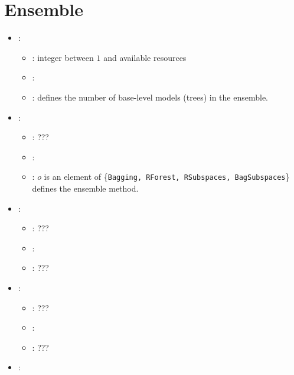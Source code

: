 \section{Ensemble}


\begin{itemize}
    \item {}:
           \begin{itemize}
                \item \optionPossibleValues{}: integer between $1$ and available resources
                \item \optionDefaultValue{}: 
                \item \optionDescrption{}:  defines the number of base-level models (trees) in the ensemble.
           \end{itemize}
    \item {}:
           \begin{itemize}
                \item \optionPossibleValues{}: ???
                \item \optionDefaultValue{}: 
                \item \optionDescrption{}: $o$ is an element of \{\texttt{Bagging, RForest, RSubspaces, BagSubspaces}\} defines the ensemble method.
           \end{itemize}
    \item {}:
           \begin{itemize}
                \item \optionPossibleValues{}: ???
                \item \optionDefaultValue{}: 
                \item \optionDescrption{}: ???
           \end{itemize}
    \item {}:
           \begin{itemize}
                \item \optionPossibleValues{}: ???
                \item \optionDefaultValue{}: 
                \item \optionDescrption{}: ???
           \end{itemize}
    \item {}:

\end{itemize}
